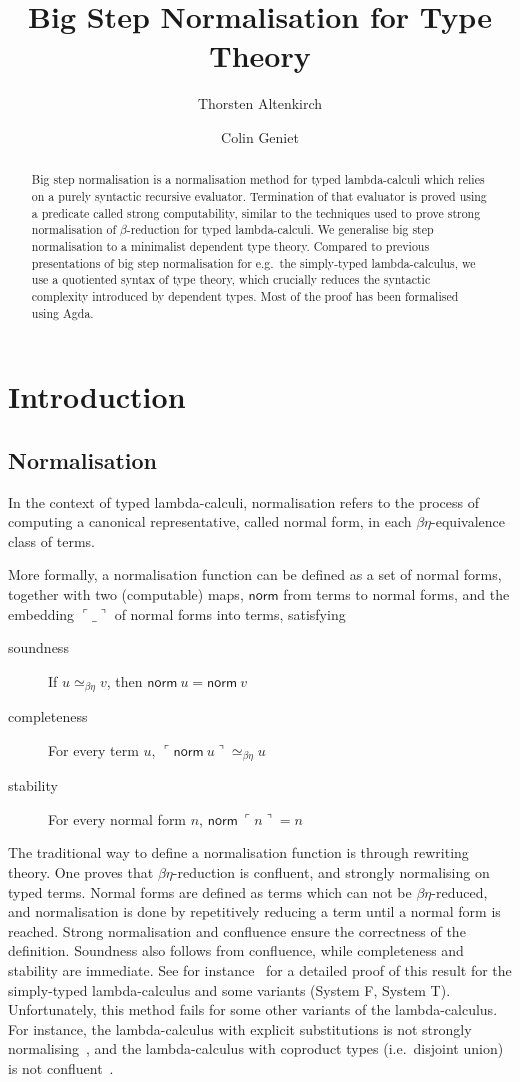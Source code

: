 \documentclass[a4paper,english]{lipics-v2019}
\title{Big Step Normalisation for Type Theory}
\author{Thorsten Altenkirch}
{School for Computer Science, University of Nottingham, United Kingdom}
{txa@cs.nott.ac.uk}{}{}
\author{Colin Geniet}
{Computer Science Department, ENS Paris-Saclay, France}
{colin.geniet@ens-paris-saclay.fr}{}{}
\newcommand{\agdaSymb}[1]{\mathsf{#1}}
\newcommand{\norm}{\agdaSymb{norm}}
\newcommand{\cul}{\ulcorner}
\newcommand{\cur}{\urcorner}
\newcommand{\Beq}{\simeq_{\beta\eta}}
\begin{document}
\maketitle

\begin{abstract}
  Big step normalisation is a normalisation method for typed lambda-calculi
  which relies on a purely syntactic recursive evaluator. Termination of that
  evaluator is proved using a predicate called strong computability, similar to
  the techniques used to prove strong normalisation of $\beta$-reduction for
  typed lambda-calculi. We generalise big step normalisation to a minimalist
  dependent type theory. Compared to previous presentations of big step
  normalisation for e.g.\ the simply-typed lambda-calculus, we use a quotiented
  syntax of type theory, which crucially reduces the syntactic complexity
  introduced by dependent types. Most of the proof has been formalised using
  Agda.
\end{abstract}

\section{Introduction}
\subsection{Normalisation}
In the context of typed lambda-calculi, normalisation refers to the process of
computing a canonical representative, called normal form, in each
$\beta\eta$-equivalence class of terms.

More formally, a normalisation function can be defined as a set of normal forms,
together with two (computable) maps, $\norm$ from terms to normal forms, and the
embedding $\cul\_\cur$ of normal forms into terms, satisfying
\begin{description}
\item[soundness] If $u \Beq v$, then $\norm\ u = \norm\ v$
\item[completeness] For every term $u$, $\cul \norm\ u \cur \Beq u$
\item[stability] For every normal form $n$, $\norm\ \cul n \cur = n$
\end{description}

The traditional way to define a normalisation function is through rewriting
theory. One proves that $\beta\eta$-reduction is confluent, and strongly normalising
on typed terms. Normal forms are defined as terms which can not be
$\beta\eta$-reduced, and normalisation is done by repetitively reducing a term
until a normal form is reached. Strong normalisation and confluence ensure the
correctness of the definition. Soundness also follows from confluence, while
completeness and stability are immediate. See for instance~\cite{girard1989proofs}
for a detailed proof of this result for the simply-typed lambda-calculus and some
variants (System F, System T). Unfortunately, this method fails for some other
variants of the lambda-calculus. For instance, the lambda-calculus with explicit
substitutions is not strongly normalising~\cite{mellies1995explicit}, and the
lambda-calculus with coproduct types (i.e.\ disjoint union) is not
confluent~\cite{dougherty1995coproducts}.
\end{document}
